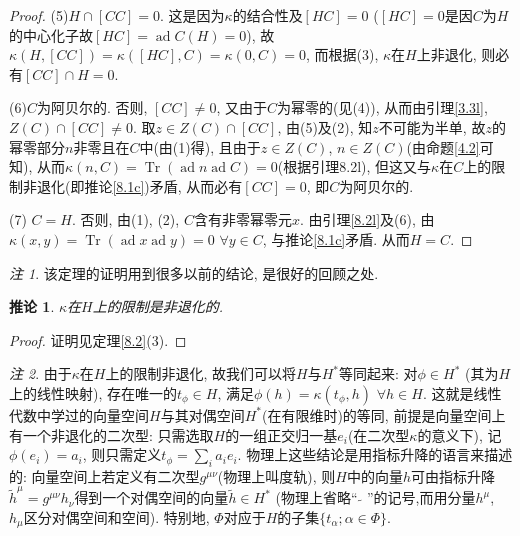 \documentclass{ctexart}%
\newtheorem{corollary}{推论}
\theoremstyle{definition}
\theoremstyle{remark}
\newtheorem{remark}{注}
\DeclareMathOperator{\ad}{ad}
\DeclareMathOperator{\Tr}{Tr}
\begin{document}
\begin{proof}
(5)$H\cap[CC]=0$. 这是因为$\kappa$的结合性及$[HC]=0$ ($[HC]=0$是因$C$为$H$的中心化子故$[HC]=\ad C(H)=0$), 故$\kappa(H,[CC])=\kappa([HC],C)=\kappa(0,C)=0$, 而根据(3), $\kappa$在$H$上非退化, 则必有$[CC]\cap H=0$.

(6)$C$为阿贝尔的. 否则, $[CC]\neq 0$, 又由于$C$为幂零的(见(4)), 从而由引理\ref{3.3l}, $Z(C)\cap [CC]\neq 0$. 取$z\in Z(C)\cap[CC]$, 由(5)及(2), 知$z$不可能为半单, 故$z$的幂零部分$n$非零且在$C$中(由(1)得), 且由于$z\in Z(C)$, $n\in Z(C)$(由命题\ref{4.2}可知), 从而$\kappa(n,C)=\Tr(\ad n\ad C)=0$(根据引理{8.2l}), 但这又与$\kappa$在$C$上的限制非退化(即推论\ref{8.1c})矛盾, 从而必有$[CC]=0$, 即$C$为阿贝尔的.

(7) $C=H$. 否则, 由(1), (2), $C$含有非零幂零元$x$. 由引理\ref{8.2l}及(6), 由$\kappa(x,y)=\Tr(\ad x\ad y)=0$ $\forall y\in C$, 与推论\ref{8.1c}矛盾. 从而$H=C$.
\end{proof}
\begin{remark}
该定理的证明用到很多以前的结论, 是很好的回顾之处.
\end{remark}

\begin{corollary}\label{8.2p}
$\kappa$在$H$上的限制是非退化的.
\end{corollary}
\begin{proof}
证明见定理\ref{8.2}(3).
\end{proof}
\begin{remark}
由于$\kappa$在$H$上的限制非退化, 故我们可以将$H$与$H^*$等同起来: 对$\phi\in H^*$ (其为$H$上的线性映射), 存在唯一的$t_\phi\in H$, 满足$\phi(h)=\kappa(t_\phi,h)$ $\forall h\in H$. 这就是线性代数中学过的向量空间$H$与其对偶空间$H^*$(在有限维时)的等同, 前提是向量空间上有一个非退化的二次型: 只需选取$H$的一组正交归一基$e_i$(在二次型$\kappa$的意义下), 记$\phi(e_i)=a_i$, 则只需定义$t_\phi = \sum_i a_i e_i$. 物理上这些结论是用指标升降的语言来描述的: 向量空间上若定义有二次型$g^{\mu\nu}$(物理上叫度轨), 则$H$中的向量$h$可由指标升降$\widetilde{h}^\mu=g^{\mu\nu} h_\nu$得到一个对偶空间的向量$\widetilde{h}\in H^*$ (物理上省略``$\widetilde{\,\,\,\,}$''的记号,而用分量$h^\mu$, $h_\mu$区分对偶空间和空间). 特别地, $\Phi$对应于$H$的子集$\{t_\alpha;\alpha\in\Phi\}$. 
\end{remark}
\end{document}
